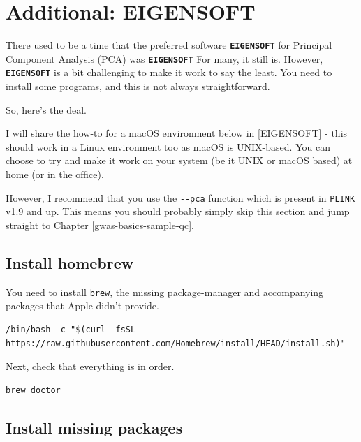 \documentclass[
]{book}
\newcommand{\passthrough}[1]{#1}
\begin{document}
\hypertarget{eigensoft}{%
\chapter{Additional: EIGENSOFT}\label{eigensoft}}

There used to be a time that the preferred software \textbf{\href{https://github.com/DReichLab/EIG}{\passthrough{\lstinline!EIGENSOFT!}}} for Principal Component Analysis (PCA) was \textbf{\passthrough{\lstinline!EIGENSOFT!}} For many, it still is. However, \textbf{\passthrough{\lstinline!EIGENSOFT!}} is a bit challenging to make it work to say the least. You need to install some programs, and this is not always straightforward.

So, here's the deal.

I will share the how-to for a macOS environment below in {[}EIGENSOFT{]} - this should work in a Linux environment too as macOS is UNIX-based. You can choose to try and make it work on your system (be it UNIX or macOS based) at home (or in the office).

However, I recommend that you use the \passthrough{\lstinline!--pca!} function which is present in \passthrough{\lstinline!PLINK!} v1.9 and up. This means you should probably simply skip this section and jump straight to Chapter \ref{gwas-basics-sample-qc}.

\hypertarget{install-homebrew}{%
\section{Install homebrew}\label{install-homebrew}}

You need to install \passthrough{\lstinline!brew!}, the missing package-manager and accompanying packages that Apple didn't provide.

\begin{lstlisting}
/bin/bash -c "$(curl -fsSL https://raw.githubusercontent.com/Homebrew/install/HEAD/install.sh)"
\end{lstlisting}

Next, check that everything is in order.

\begin{lstlisting}
brew doctor
\end{lstlisting}

\hypertarget{install-missing-packages}{%
\section{Install missing packages}\label{install-missing-packages}}
\end{document}
